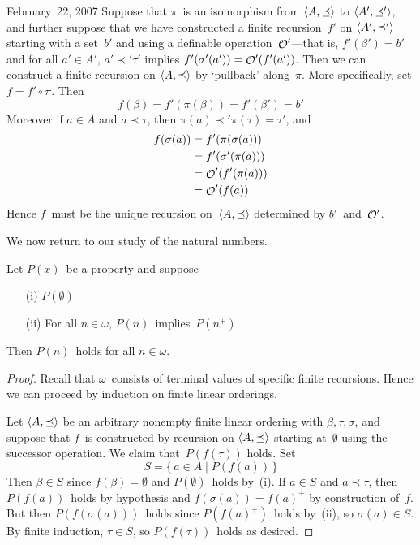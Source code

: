 \begin{lecture}{February~22, 2007}
Suppose that \(\pi\)~is an isomorphism from \(\langle{A},{\preceq}\rangle\) to \(\langle{A'},{\preceq'}\rangle\), and further suppose that we have constructed a finite recursion~\(f'\) on \(\langle{A'},{\preceq'}\rangle\) starting with a set~\(b'\) and using a definable operation~\(\mathop{\mathcal{O}}\nolimits'\)---that is, \(f'(\beta')=b'\) and for all \(a'\in A'\), \(a'\prec'\tau'\) implies \(f'(\sigma'(a'))=\mathop{\mathcal{O}}\nolimits'(f'(a'))\). Then we can construct a finite recursion on \(\langle{A},{\preceq}\rangle\) by `pullback' along~\(\pi\). More specifically, set \(f=f'\circ\pi\). Then
\[f(\beta)=f'(\pi(\beta))=f'(\beta')=b'\]
Moreover if \(a\in A\) and \(a\prec\tau\), then \(\pi(a)\prec'\pi(\tau)=\tau'\), and
\begin{align*}
f(\sigma(a))&=f'(\pi(\sigma(a)))\\
	&=f'(\sigma'(\pi(a)))\\
	&=\mathop{\mathcal{O}}\nolimits'(f'(\pi(a)))\\
	&=\mathop{\mathcal{O}}\nolimits'(f(a))
\end{align*}
Hence \(f\)~must be the unique recursion on~\(\langle{A},{\preceq}\rangle\) determined by \(b'\)~and~\(\mathop{\mathcal{O}}\nolimits'\).

We now return to our study of the natural numbers.
\begin{thm}
Let \(P(x)\)~be a property and suppose
\begin{enumerate}[itemsep=0pt]
\item[(i)] \(P(\emptyset)\)
\item[(ii)] For all \(n\in\omega\), \(P(n)\)~implies~\(P(n^+)\)
\end{enumerate}
Then \(P(n)\)~holds for all \(n\in\omega\).
\end{thm}
\begin{proof}
Recall that \(\omega\)~consists of terminal values of specific finite recursions. Hence we can proceed by induction on finite linear orderings.

Let \(\langle{A},{\preceq}\rangle\) be an arbitrary nonempty finite linear ordering with \(\beta,\tau,\sigma\), and suppose that \(f\)~is constructed by recursion on \(\langle{A},{\preceq}\rangle\) starting at~\(\emptyset\) using the successor operation. We claim that~\(P(f(\tau))\) holds. Set
\[S=\{\,a\in A\mid P(f(a))\,\}\]
Then \(\beta\in S\) since \(f(\beta)=\emptyset\) and \(P(\emptyset)\)~holds by~(i). If \(a\in S\) and \(a\prec\tau\), then \(P(f(a))\)~holds by hypothesis and \(f(\sigma(a))=f(a)^+\) by construction of~\(f\). But then \(P(f(\sigma(a)))\)~holds since \(P(f(a)^+)\)~holds by~(ii), so \(\sigma(a)\in S\). By finite induction, \(\tau\in S\), so \(P(f(\tau))\)~holds as desired.


\end{proof}
\end{lecture}
